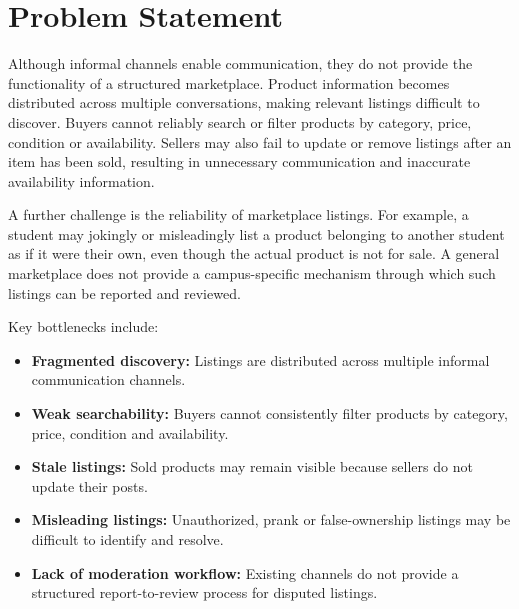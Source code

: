\documentclass[11pt,a4paper]{article}
\begin{document}
\section{Problem Statement}

Although informal channels enable communication, they do not provide
the functionality of a structured marketplace. Product information
becomes distributed across multiple conversations, making relevant
listings difficult to discover. Buyers cannot reliably search or
filter products by category, price, condition or availability.
Sellers may also fail to update or remove listings after an item has
been sold, resulting in unnecessary communication and inaccurate
availability information.

A further challenge is the reliability of marketplace listings.
For example, a student may jokingly or misleadingly list a product
belonging to another student as if it were their own, even though the
actual product is not for sale. A general marketplace does not provide
a campus-specific mechanism through which such listings can be
reported and reviewed.

Key bottlenecks include:

\begin{itemize}

    \item \textbf{Fragmented discovery:}
    Listings are distributed across multiple informal communication
    channels.

    \item \textbf{Weak searchability:}
    Buyers cannot consistently filter products by category, price,
    condition and availability.

    \item \textbf{Stale listings:}
    Sold products may remain visible because sellers do not update
    their posts.

    \item \textbf{Misleading listings:}
    Unauthorized, prank or false-ownership listings may be difficult
    to identify and resolve.

    \item \textbf{Lack of moderation workflow:}
    Existing channels do not provide a structured report-to-review
    process for disputed listings.

\end{itemize}

\end{document}
